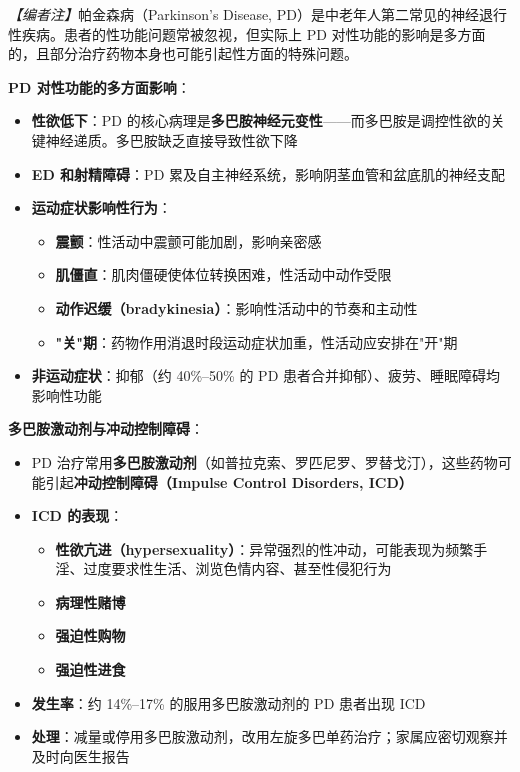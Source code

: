 \begin{enumerate}
\noindent\textit{【编者注】}帕金森病（Parkinson's Disease, PD）是中老年人第二常见的神经退行性疾病。患者的性功能问题常被忽视，但实际上 PD 对性功能的影响是多方面的，且部分治疗药物本身也可能引起性方面的特殊问题。

\vspace{0.5em}
\noindent\textbf{PD 对性功能的多方面影响}：

\begin{itemize}[leftmargin=2cm]
	\item \textbf{性欲低下}：PD 的核心病理是\textbf{多巴胺神经元变性}——而多巴胺是调控性欲的关键神经递质。多巴胺缺乏直接导致性欲下降
	\item \textbf{ED 和射精障碍}：PD 累及自主神经系统，影响阴茎血管和盆底肌的神经支配
	\item \textbf{运动症状影响性行为}：
	\begin{itemize}
		\item \textbf{震颤}：性活动中震颤可能加剧，影响亲密感
		\item \textbf{肌僵直}：肌肉僵硬使体位转换困难，性活动中动作受限
		\item \textbf{动作迟缓（bradykinesia）}：影响性活动中的节奏和主动性
		\item \textbf{"关"期}：药物作用消退时段运动症状加重，性活动应安排在"开"期
	\end{itemize}
	\item \textbf{非运动症状}：抑郁（约 40\%--50\% 的 PD 患者合并抑郁）、疲劳、睡眠障碍均影响性功能
\end{itemize}

\vspace{0.5em}
\noindent\textbf{多巴胺激动剂与冲动控制障碍}：

\begin{itemize}[leftmargin=2cm]
	\item PD 治疗常用\textbf{多巴胺激动剂}（如普拉克索、罗匹尼罗、罗替戈汀），这些药物可能引起\textbf{冲动控制障碍（Impulse Control Disorders, ICD）}
	\item \textbf{ICD 的表现}：
	\begin{itemize}
		\item \textbf{性欲亢进（hypersexuality）}：异常强烈的性冲动，可能表现为频繁手淫、过度要求性生活、浏览色情内容、甚至性侵犯行为
		\item \textbf{病理性赌博}
		\item \textbf{强迫性购物}
		\item \textbf{强迫性进食}
	\end{itemize}
	\item \textbf{发生率}：约 14\%--17\% 的服用多巴胺激动剂的 PD 患者出现 ICD
	\item \textbf{处理}：减量或停用多巴胺激动剂，改用左旋多巴单药治疗；家属应密切观察并及时向医生报告
\end{itemize}


\end{enumerate}
